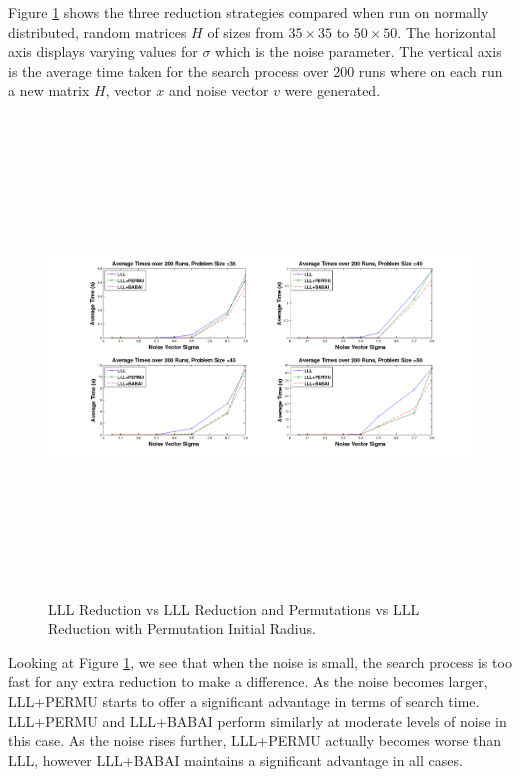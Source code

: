 \documentclass[12pt,Bold,letterpaper]{mcgilletdclass}
\begin{document}
Figure \ref{fig:LLLvsPermuvsBabai} shows the three reduction strategies compared when run on normally distributed, random matrices $H$ of sizes from $35 \times 35$ to $50 \times 50$. The horizontal axis displays varying values for $\sigma$ which is the noise parameter. The vertical axis is the average time taken for the search process over $200$ runs where on each run a new matrix $H$, vector $x$ and noise vector $v$ were generated.

\begin{figure}
\centering
\includegraphics[width=6.5in,height=5in]{lllvspermuvsbabai.png}
\caption{LLL Reduction vs LLL Reduction and Permutations vs LLL Reduction with Permutation Initial Radius.}
\label{fig:LLLvsPermuvsBabai}
\end{figure}

Looking at Figure \ref{fig:LLLvsPermuvsBabai}, we see that when the noise is small, the search process is too fast for any extra reduction to make a difference. As the noise becomes larger, LLL+PERMU starts to offer a significant advantage in terms of search time. LLL+PERMU and LLL+BABAI perform similarly at moderate levels of noise in this case. As the noise rises further, LLL+PERMU actually becomes worse than LLL, however LLL+BABAI maintains a significant advantage in all cases.
\end{document}
